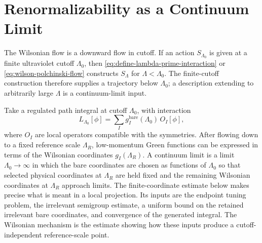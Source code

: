 \section{Renormalizability as a Continuum Limit}

The Wilsonian flow is a downward flow in cutoff.  If an action
\(S_{\Lambda_0}\) is given at a finite ultraviolet cutoff \(\Lambda_0\), then
\eqref{eq:define-lambda-prime-interaction} or
\eqref{eq:wilson-polchinski-flow} constructs \(S_\Lambda\) for
\(\Lambda<\Lambda_0\).  The finite-cutoff construction therefore supplies a
trajectory below \(\Lambda_0\); a description extending to arbitrarily large
\(\Lambda\) is a continuum-limit input.

Take a regulated path integral at cutoff \(\Lambda_0\), with interaction
\begin{equation}
  L_{\Lambda_0}[\phi]
  =
  \sum_I g_I^{\mathrm{bare}}(\Lambda_0)\,O_I[\phi],
  \label{eq:bare-action-at-lambda-zero}
\end{equation}
where \(O_I\) are local operators compatible with the symmetries.  After
flowing down to a fixed reference scale \(\Lambda_R\), low-momentum Green
functions can be expressed in terms of the Wilsonian coordinates
\(g_I(\Lambda_R)\).  A continuum limit is a limit
\(\Lambda_0\to\infty\) in which the bare coordinates are chosen as functions
of \(\Lambda_0\) so that selected physical coordinates at \(\Lambda_R\) are
held fixed and the remaining Wilsonian coordinates at \(\Lambda_R\) approach
limits.
The finite-coordinate estimate below makes precise what is meant in a local
projection.  Its inputs are the endpoint tuning problem, the irrelevant
semigroup estimate, a uniform bound on the retained irrelevant bare
coordinates, and convergence of the generated integral.  The Wilsonian
mechanism is the estimate showing how these inputs produce a
cutoff-independent reference-scale point.

